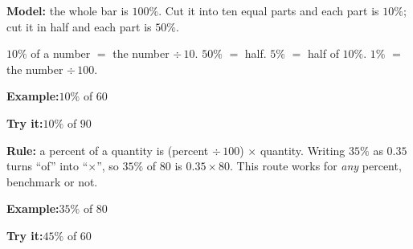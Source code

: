 \documentclass[12pt]{article}
\begin{document}


\begin{formulabox}
\textbf{Model:} the whole bar is $100\%$. Cut it into ten equal parts and each part
is $10\%$; cut it in half and each part is $50\%$.\par
$10\%$ of a number $=$ the number $\div\,10$. \quad
$50\%$ $=$ half. \quad $5\%$ $=$ half of $10\%$. \quad $1\%$ $=$ the number $\div\,100$.
\end{formulabox}

\begin{examplebox}
\textbf{Example:}\quad $10\%$ of $60$
\end{examplebox}

\begin{tryitbox}
\textbf{Try it:}\quad $10\%$ of $90$\\[2pt]
\end{tryitbox}


\begin{formulabox}
\textbf{Rule:} a percent of a quantity is (percent $\div\,100$) $\times$ quantity.
Writing $35\%$ as $0.35$ turns ``of'' into ``$\times$'', so
$35\%$ of $80$ is $0.35 \times 80$. This route works for \emph{any} percent,
benchmark or not.
\end{formulabox}

\begin{examplebox}
\textbf{Example:}\quad $35\%$ of $80$
\end{examplebox}

\begin{tryitbox}
\textbf{Try it:}\quad $45\%$ of $60$\\[2pt]
\end{tryitbox}

\end{document}
